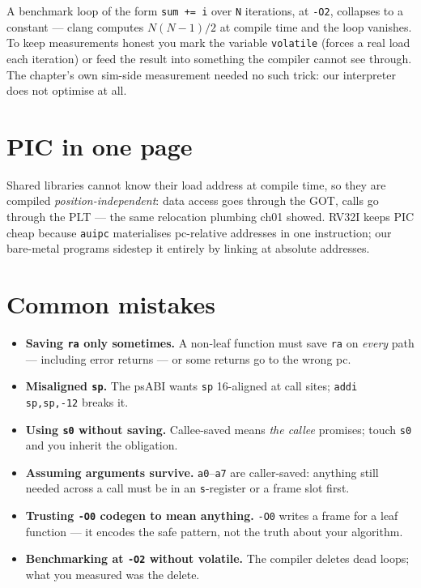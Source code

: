 \begin{example}\label{ex:volatile04}
A benchmark loop of the form \texttt{sum += i} over \texttt{N}
iterations, at \texttt{-O2}, collapses to a constant --- clang computes
$N(N-1)/2$ at compile time and the loop vanishes. To keep
measurements honest you mark the variable \texttt{volatile} (forces
a real load each iteration) or feed the result into something the
compiler cannot see through. The chapter's own sim-side measurement
needed no such trick: our interpreter does not optimise at all.
\end{example}

\section{PIC in one page}
\label{sec:pic04}

Shared libraries cannot know their load address at compile time, so
they are compiled \emph{position-independent}: data access goes
through the GOT, calls go through the PLT --- the same relocation
plumbing ch01 showed. RV32I keeps PIC cheap because \texttt{auipc}
materialises pc-relative addresses in one instruction; our bare-metal
programs sidestep it entirely by linking at absolute addresses.

\section{Common mistakes}
\label{sec:mistakes04}
\begin{itemize}
\item \textbf{Saving \texttt{ra} only sometimes.} A non-leaf function
      must save \texttt{ra} on \emph{every} path --- including error
      returns --- or some returns go to the wrong pc.
\item \textbf{Misaligned \texttt{sp}.} The psABI wants \texttt{sp}
      16-aligned at call sites; \texttt{addi sp,sp,-12} breaks it.
\item \textbf{Using \texttt{s0} without saving.} Callee-saved means
      \emph{the callee} promises; touch \texttt{s0} and you inherit
      the obligation.
\item \textbf{Assuming arguments survive.} \texttt{a0}--\texttt{a7}
      are caller-saved: anything still needed across a call must be
      in an \texttt{s}-register or a frame slot first.
\item \textbf{Trusting \texttt{-O0} codegen to mean anything.}
      \texttt{-O0} writes a frame for a leaf function --- it encodes
      the safe pattern, not the truth about your algorithm.
\item \textbf{Benchmarking at \texttt{-O2} without volatile.}
      The compiler deletes dead loops; what you measured was the
      delete.
\end{itemize}

